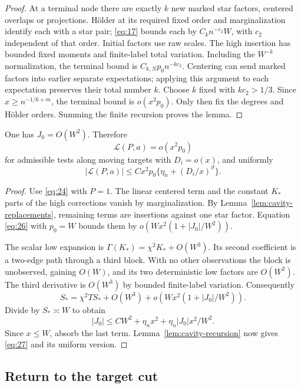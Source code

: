 \begin{proof}
At a terminal node there are exactly \(k\)
new marked star factors, centered overlaps or
projections. H\"older at its required fixed
order and marginalization identify each with
a star pair; \eqref{eq:17} bounds each by
\(C_kn^{-c_2}W\), with \(c_2\) independent
of that order. Initial factors use raw scales.
The high insertion has bounded fixed moments
and finite-label total variation. Including
the \(W^{-k}\) normalization, the terminal
bound is \(C_{k,N}p_0n^{-kc_2}\).
Centering can send marked factors into
earlier separate expectations; applying this
argument to each expectation preserves their
total number \(k\). Choose \(k\) fixed with
\(kc_2>1/3\). Since \(x\ge n^{-1/6+m}\),
the terminal bound is \(o(x^2p_0)\).
Only then fix the degrees and H\"older orders.
Summing the finite recursion proves the lemma.
\end{proof}

\begin{lemma}\label{lem:cavity-calibration}
One has \(J_0=O(W^2)\). Therefore
\begin{equation}\label{eq:27}\tag{27}
                         \mathcal L(P,a)=o(x^2p_0)
\end{equation}
for admissible tests along moving targets with \(D_i=o(x)\),
and uniformly
\[
 |\mathcal L(P,a)|\le Cx^2p_0\{\eta_n+(D_i/x)^\vartheta\}.
\]
\end{lemma}

\begin{proof}
Use \eqref{eq:24} with \(P=1\). The linear centered term
and the constant \(K_*\) parts of the high corrections
vanish by marginalization. By
Lemma~\ref{lem:cavity-replacements}, remaining terms are
insertions against one star factor. Equation \eqref{eq:26}
with \(p_0=W\) bounds them by
\(o(Wx^2(1+|J_0|/W^2))\).

The scalar low expansion is
\(\Gamma(K_*)=\chi^2K_*+O(W^3)\).
Its second coefficient is a two-edge path
through a third block. With no other observations
the block is unobserved, gaining \(O(W)\),
and its two deterministic low factors are
\(O(W^2)\). The third derivative is
\(O(W^3)\) by bounded finite-label variation.
Consequently
\[
 S_*=\chi^2TS_*+O(W^3)+o(Wx^2(1+|J_0|/W^2)).
\]
Divide by \(S_*\asymp W\) to obtain
\[
 |J_0|\le CW^2+\eta_nx^2+\eta_n|J_0|x^2/W^2.
\]
Since \(x\le W\), absorb the last term.
Lemma~\ref{lem:cavity-recursion} now gives
\eqref{eq:27} and its uniform version.
\end{proof}

\subsection{Return to the target cut}

